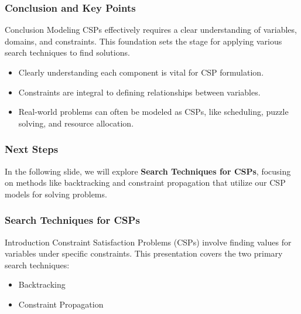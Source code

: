 \documentclass[aspectratio=169]{beamer}
\begin{document}
\begin{frame}[fragile]
    \frametitle{Conclusion and Key Points}
    \begin{block}{Conclusion}
        Modeling CSPs effectively requires a clear understanding of variables, domains, and constraints. This foundation sets the stage for applying various search techniques to find solutions.
    \end{block}
    \begin{itemize}
        \item Clearly understanding each component is vital for CSP formulation.
        \item Constraints are integral to defining relationships between variables.
        \item Real-world problems can often be modeled as CSPs, like scheduling, puzzle solving, and resource allocation.
    \end{itemize}
\end{frame}

\begin{frame}[fragile]
    \frametitle{Next Steps}
    In the following slide, we will explore \textbf{Search Techniques for CSPs}, focusing on methods like backtracking and constraint propagation that utilize our CSP models for solving problems.
\end{frame}

\begin{frame}[fragile]
    \frametitle{Search Techniques for CSPs}
    \begin{block}{Introduction}
        Constraint Satisfaction Problems (CSPs) involve finding values for variables under specific constraints.
        This presentation covers the two primary search techniques: 
        \begin{itemize}
            \item Backtracking
            \item Constraint Propagation
        \end{itemize}
    \end{block}
\end{frame}
\end{document}
